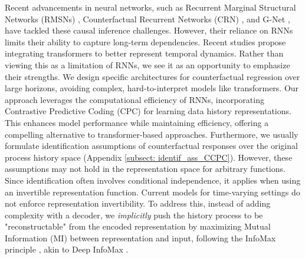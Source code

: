 \documentclass{article}
\theoremstyle{plain}
\theoremstyle{definition}
\theoremstyle{remark}
\begin{document}
Recent advancements in neural networks, such as Recurrent Marginal Structural Networks (RMSNs) \citep{lim2018forecasting}, Counterfactual Recurrent Networks (CRN) \citep{bica2020estimatingCRN}, and G-Net \cite{Li2021GNetAR}, have tackled these causal inference challenges. However, their reliance on RNNs limits their ability to capture long-term dependencies. Recent studies \cite{Melnychuk2022CausalTF} propose integrating transformers to better represent temporal dynamics. Rather than viewing this as a limitation of RNNs, we see it as an opportunity to emphasize their strengths. We design specific architectures for counterfactual regression over large horizons, avoiding complex, hard-to-interpret models like transformers. Our approach leverages the computational efficiency of RNNs, incorporating Contrastive Predictive Coding (CPC) \citep{oord2018representation, henaff2020data} for learning data history representations. This enhances model performance while maintaining efficiency, offering a compelling alternative to transformer-based approaches. Furthermore, we usually formulate identification assumptions of counterfactual responses over the original process history space (Appendix \ref{subsect: identif_ass_CCPC}). However, these assumptions may not hold in the representation space for arbitrary functions. Since identification often involves conditional independence, it applies when using an invertible representation function. Current models for time-varying settings \citep{lim2018forecasting, bica2020estimatingCRN, Melnychuk2022CausalTF} do not enforce representation invertibility. To address this, instead of adding complexity with a decoder, we \emph{implicitly} push the history process to be "reconstructable" from the encoded representation by maximizing Mutual Information (MI) between representation and input, following the InfoMax principle \cite{linsker1988selforga}, akin to Deep InfoMax \citep{DeepInfoMax2019}.
\end{document}
